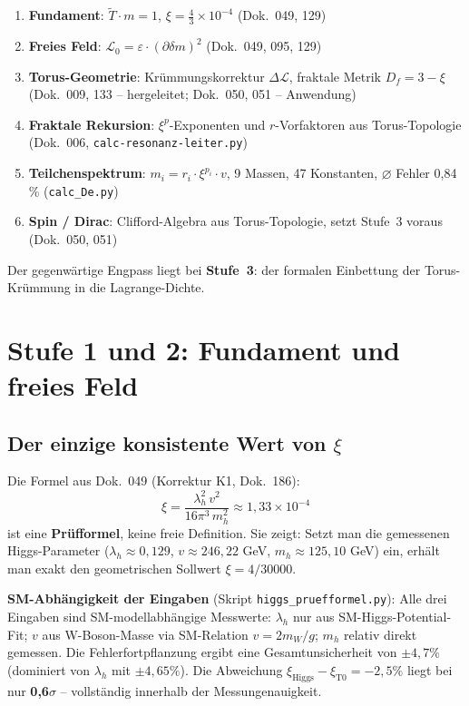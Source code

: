 \begin{enumerate}
    \item \textbf{Fundament}: $\tilde{T} \cdot m = 1$,
          $\xi = \frac{4}{3} \times 10^{-4}$ (Dok.~049, 129)
    \item \textbf{Freies Feld}: $\mathcal{L}_0 = \varepsilon \cdot
          (\partial\delta m)^2$ (Dok.~049, 095, 129)
    \item \textbf{Torus-Geometrie}: Krümmungskorrektur $\Delta\mathcal{L}$,
          fraktale Metrik $D_f = 3 - \xi$ (Dok.~009, 133 -- hergeleitet; Dok.~050, 051 -- Anwendung)
    \item \textbf{Fraktale Rekursion}: $\xi^p$-Exponenten und
          $r$-Vorfaktoren aus Torus-Topologie (Dok.~006,
          \texttt{calc-resonanz-leiter.py})
    \item \textbf{Teilchenspektrum}: $m_i = r_i \cdot \xi^{p_i} \cdot v$,
          9 Massen, 47 Konstanten, $\varnothing$ Fehler 0{,}84\,\%
          (\texttt{calc\_De.py})
    \item \textbf{Spin / Dirac}: Clifford-Algebra aus Torus-Topologie,
          setzt Stufe~3 voraus (Dok.~050, 051)
\end{enumerate}

Der gegenwärtige Engpass liegt bei \textbf{Stufe~3}: der formalen
Einbettung der Torus-Krümmung in die Lagrange-Dichte.

\section{Stufe 1 und 2: Fundament und freies Feld}

\subsection{Der einzige konsistente Wert von \texorpdfstring{$\xi$}{xi}}

Die Formel aus Dok.~049 (Korrektur K1, Dok.~186):
\begin{equation}
    \xi = \frac{\lambda_h^2\, v^2}{16\pi^3\, m_h^2}
    \approx 1{,}33 \times 10^{-4}
    \label{eq:xi_higgs}
\end{equation}
ist eine \textbf{Prüfformel}, keine freie Definition. Sie zeigt:
Setzt man die gemessenen Higgs-Parameter
($\lambda_h \approx 0{,}129$, $v \approx 246{,}22$ GeV,
$m_h \approx 125{,}10$ GeV) ein, erhält man exakt den
geometrischen Sollwert $\xi = 4/30000$.

\textbf{SM-Abhängigkeit der Eingaben} (Skript \texttt{higgs\_pruefformel.py}):
Alle drei Eingaben sind SM-modellabhängige Messwerte:
$\lambda_h$ nur aus SM-Higgs-Potential-Fit;
$v$ aus W-Boson-Masse via SM-Relation $v = 2m_W/g$;
$m_h$ relativ direkt gemessen.
Die Fehlerfortpflanzung ergibt eine Gesamtunsicherheit von $\pm 4{,}7\%$
(dominiert von $\lambda_h$ mit $\pm 4{,}65\%$).
Die Abweichung $\xi_{\text{Higgs}} - \xi_{\text{T0}} = -2{,}5\%$
liegt bei nur \textbf{0,6$\sigma$} -- vollständig innerhalb der
Messungenauigkeit.

